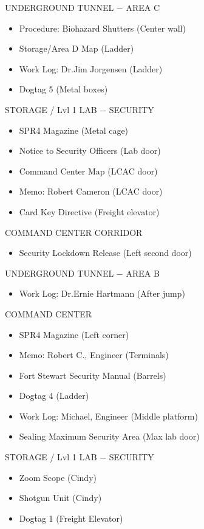 \begin{subregion}{UNDERGROUND TUNNEL $\boldsymbol{-}$ AREA C}
    \begin{itemize}
        \item Procedure: Biohazard Shutters (Center wall)
        \item Storage/Area D Map (Ladder)
        \item Work Log: Dr.Jim Jorgensen (Ladder)
        \item Dogtag 5 (Metal boxes)
    \end{itemize}
\end{subregion}

\begin{subregion}{STORAGE / Lvl 1 LAB $\boldsymbol{-}$ SECURITY}
    \begin{itemize}
        \item SPR4 Magazine (Metal cage)
        \item Notice to Security Officers (Lab door)
        \item Command Center Map (LCAC door)
        \item Memo: Robert Cameron (LCAC door)
        \item Card Key Directive (Freight elevator)
    \end{itemize}
\end{subregion}


\begin{subregion}{COMMAND CENTER CORRIDOR}
    \begin{itemize}
        \item Security Lockdown Release (Left second door)
    \end{itemize}
\end{subregion}

\begin{subregion}{UNDERGROUND TUNNEL $\boldsymbol{-}$ AREA B}
    \begin{itemize}
        \item Work Log: Dr.Ernie Hartmann (After jump)
    \end{itemize}
\end{subregion}

\begin{subregion}{COMMAND CENTER}
    \begin{itemize}
        \item SPR4 Magazine (Left corner)
        \item Memo: Robert C., Engineer (Terminals)
        \item Fort Stewart Security Manual (Barrels)
        \item Dogtag 4 (Ladder)
        \item Work Log: Michael, Engineer (Middle platform)
        \item Sealing Maximum Security Area (Max lab door)
    \end{itemize}
\end{subregion}

\begin{subregion}{STORAGE / Lvl 1 LAB $\boldsymbol{-}$ SECURITY}
    \begin{itemize}
        \item Zoom Scope (Cindy)
        \item Shotgun Unit (Cindy)
        \item Dogtag 1 (Freight Elevator) 
    \end{itemize}
\end{subregion}
